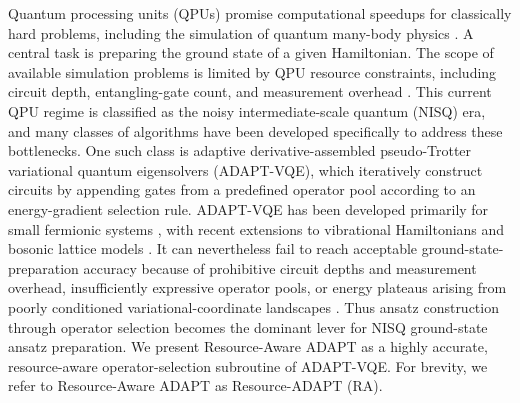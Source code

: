 \documentclass[
  reprint,
  amsmath,
  amssymb,
  aps,
  pra,
  nofootinbib,
  superscriptaddress,
  floatfix
]{revtex4-2}
\begin{document}
Quantum processing units (QPUs) promise computational speedups for classically hard problems, including the simulation of quantum many-body physics \cite{Lloyd1996,AspuruGuzik2005}. A central task is preparing the ground state of a given Hamiltonian. The scope of available simulation problems is limited by QPU resource constraints, including circuit depth, entangling-gate count, and measurement overhead \cite{Preskill2018NISQ,Cerezo2021VQA,Huggins2021Measurements}. This current QPU regime is classified as the noisy intermediate-scale quantum (NISQ) era, and many classes of algorithms have been developed specifically to address these bottlenecks. One such class is adaptive derivative-assembled pseudo-Trotter variational quantum eigensolvers (ADAPT-VQE), which iteratively construct circuits by appending gates from a predefined operator pool according to an energy-gradient selection rule. ADAPT-VQE has been developed primarily for small fermionic systems \cite{Anastasiou2024,Bespalova2026KADAPT,He2026HAADAPT,He2026ParamADAPT}, with recent extensions to vibrational Hamiltonians and bosonic lattice models \cite{Majland2024vADAPT,Athanasakos2026CVADAPT}. It can nevertheless fail to reach acceptable ground-state-preparation accuracy because of prohibitive circuit depths and measurement overhead, insufficiently expressive operator pools, or energy plateaus arising from poorly conditioned variational-coordinate landscapes \cite{Grimsley2019,Tang2021,Yordanov2021,Feniou2023,Ramoa2025HessianRecycling,Ikhtiarudin2025ShotEfficient,Stadelmann2025GradientTroughs}. Thus ansatz construction through operator selection becomes the dominant lever for NISQ ground-state ansatz preparation. We present Resource-Aware ADAPT as a highly accurate, resource-aware operator-selection subroutine of ADAPT-VQE. For brevity, we refer to Resource-Aware ADAPT as Resource-ADAPT (RA).
\end{document}
